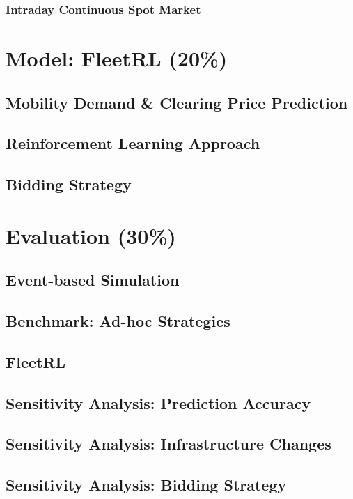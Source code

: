\documentclass[12pt, article]{article}
\begin{document}
\subsubsection{Intraday Continuous Spot Market}
\label{sec:orge41b31a}

\section{Model: FleetRL (20\%)}
\label{sec:org5303cc8}
\subsection{Mobility Demand \& Clearing Price Prediction}
\label{sec:org60a6a05}
\subsection{Reinforcement Learning Approach}
\label{sec:orgb7e3110}
\subsection{Bidding Strategy}
\label{sec:org4cff154}

\section{Evaluation (30\%)}
\label{sec:orgd9d2553}
\subsection{Event-based Simulation}
\label{sec:org97ae083}
\subsection{Benchmark: Ad-hoc Strategies}
\label{sec:org4df23dd}
\subsection{FleetRL}
\label{sec:orgd7d96b0}
\subsection{Sensitivity Analysis: Prediction Accuracy}
\label{sec:orgfe5f5bf}
\subsection{Sensitivity Analysis: Infrastructure Changes}
\label{sec:org6ac957c}
\subsection{Sensitivity Analysis: Bidding Strategy}
\label{sec:orgc0bdff3}
\end{document}
